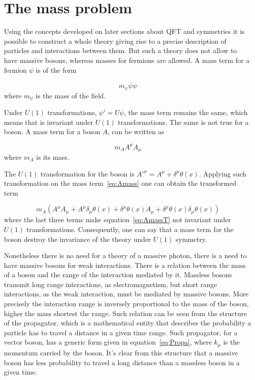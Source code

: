 \section{The mass problem}
\label{sec:mass}

Using the concepts developed on later sections about QFT and symmetries it is possible to construct a whole theory giving rise to a precise description of particles and interactions between them. But such a theory does not allow to have massive bosons, whereas masses for fermions are allowed. A mass term for a fermion $\psi$ is of the form 

\begin{equation*}
  m_{\psi}\bar{\psi}\psi
\end{equation*} where $m_{\psi}$ is the mass of the field.

Under $U(1)$ transformations, $\psi'=U \psi$, the mass term remains the same, which means that is invariant under $U(1)$ transformations. The same is not true for a boson. A mass term for a boson $A$, can be written as 

\begin{equation}
  \label{eq:Amass}
  m_{A}A^{\mu}A_{\mu}
\end{equation} where $m_{A}$ is its mass.

The $U(1)$ transformation for the boson is $A'^{\mu}=A^{\mu}+\delta^{\mu}\theta(x)$. Applying such transformation on the mass term~\ref{eq:Amass} one can obtain the transformed term

\begin{equation}
  \label{eq:AmassT}
  m_{A}\left(A^{\mu}A_{\mu}+A^{\mu}\delta_{\mu}\theta(x)+\delta^{\mu}\theta(x)A_{\mu}+\delta^{\mu}\theta(x)\delta_{\mu}\theta(x)\right)
\end{equation}where the last three terms make equation~\ref{eq:AmassT} not invariant under $U(1)$ transformations. Consequently, one can say that a mass term for the boson destroy the invariance of the theory under $U(1)$ symmetry.

Nonetheless there is no need for a theory of a massive photon, there is a need to have massive bosons for weak interactions. There is a relation between the mass of a boson and the range of the interaction mediated by it. Massless bosons transmit long range interactions, as electromagnetism, but short range interactions, as the weak interaction, must be mediated by massive bosons. More precisely the interaction range is inversely proportional to the mass of the boson, higher the mass shortest the range. Such relation can be seen from the structure of the propagator, which is a mathematical entity that describes the probability a particle has to travel a distance in a given time range. Such propagator, for a vector boson, has a generic form given in equation~\ref{eq:Propa}, where $k_{\mu}$ is the momentum carried by the boson. It's clear from this structure that a massive boson has less probability to travel a long distance than a massless boson in a given time.

